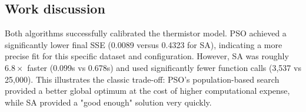 \subsection{Work discussion}
Both algorithms successfully calibrated the thermistor model. PSO achieved a significantly lower final SSE (0.0089 versus 0.4323 for SA), indicating a more precise fit for this specific dataset and configuration. However, SA was roughly $6.8\times$ faster (0.099s vs 0.678s) and used significantly fewer function calls (3,537 vs 25,000). This illustrates the classic trade-off: PSO's population-based search provided a better global optimum at the cost of higher computational expense, while SA provided a "good enough" solution very quickly.